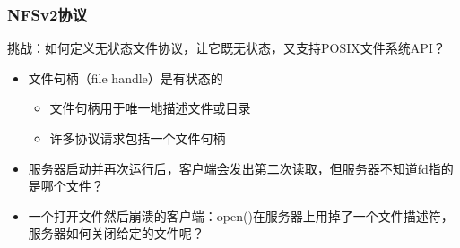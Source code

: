 \begin{frame}[fragile]
    \frametitle{NFSv2协议}
    挑战：如何定义无状态文件协议，让它既无状态，又支持POSIX文件系统API？\pause
    \begin{itemize}
        \item 文件句柄（file handle）是有状态的
        \begin{itemize}
            \item 文件句柄用于唯一地描述文件或目录
            \item 许多协议请求包括一个文件句柄        
        \end{itemize} \pause
        \item 服务器启动并再次运行后，客户端会发出第二次读取，但服务器不知道fd指的是哪个文件？
        \item 一个打开文件然后崩溃的客户端：open()在服务器上用掉了一个文件描述符，服务器如何关闭给定的文件呢？
    \end{itemize}

\end{frame}


